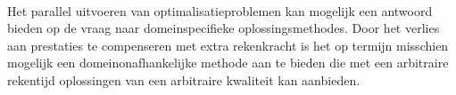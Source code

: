 \paragraph{}
Het parallel uitvoeren van optimalisatieproblemen kan mogelijk een antwoord bieden op de vraag naar domeinspecifieke oplossingsmethodes. Door het verlies aan prestaties te compenseren met extra rekenkracht is het op termijn misschien mogelijk een domeinonafhankelijke methode aan te bieden die met een arbitraire rekentijd oplossingen van een arbitraire kwaliteit kan aanbieden.





